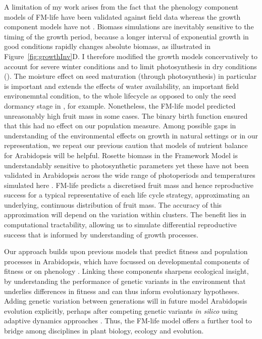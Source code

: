 A limitation of my work arises from the fact that the phenology component models
of FM-life have been validated against field data
\citep{wilczek_effects_2009,burghardt_modeling_2015} whereas the growth
component models have not
\citep{rasse_leaf_2006,christophe_model-based_2008}. Biomass simulations are
inevitably sensitive to the timing of the growth period, because a longer
interval of exponential growth in good conditions rapidly changes absolute
biomass, as illustrated in Figure~\ref{fig:growthInv}D. I therefore modified the
growth models concervatively to account for severe winter conditions and to
limit photosynthesis in dry conditions (). The moisture effect on
seed maturation (through photosynthesis) in particular is important and extends
the effects of water availability, an important field environemntal condition,
to the whole lifecycle as opposed to only the seed dormancy stage in
\citep{burghardt_modeling_2015}, for example. Nonetheless, the FM-life model
predicted unreasonably high fruit mass in some cases. The binary birth function
ensured that this had no effect on our population measure. Among possible gaps
in understanding of the environmental effects on growth in natural settings or
in our representation, we repeat our previous caution
\citep{chew_multiscale_2014, chew_linking_2017} that models of nutrient balance
for Arabidopsis will be helpful. Rosette biomass in the Framework Model is
understandably sensitive to photosynthetic parameters
\citep{chew_multiscale_2014} yet these have not been validated in Arabidopsis
across the wide range of photoperiods and temperatures simulated here
\citep{walker_temperature_2013}. FM-life predicts a discretised fruit mass and
hence reproductive success for a typical representative of each life cycle
strategy, approximating an underlying, continuous distribution of fruit
mass. The accuracy of this approximation will depend on the variation within
clusters. The benefit lies in computational tractability, allowing us to
simulate differential reproductive success that is informed by understanding of
growth processes.

Our approach builds upon previous models that predict fitness and population
processes in Arabidopsis, which have focussed on developmental components of
fitness or on phenology
\citep{prusinkiewicz_evolution_2007,satake_forecasting_2013,springthorpe_flowering_2015}. Linking
these components sharpens ecological insight, by understanding the performance
of genetic variants in the environment that underlies differences in fitness
\citep[see discussions in][]{burghardt_modeling_2015, doebeli_towards_2017} and
can thus inform evolutionary hypotheses. Adding genetic variation between
generations will in future model Arabidopsis evolution explicitly, perhaps after
competing genetic variants \emph{in silico} using adaptive dynamics approaches
\citep{brannstrom_hitchhikers_2013, weise_mechanistic_2015}.  Thus, the FM-life
model offers a further tool to bridge among disciplines in plant biology,
ecology and evolution.